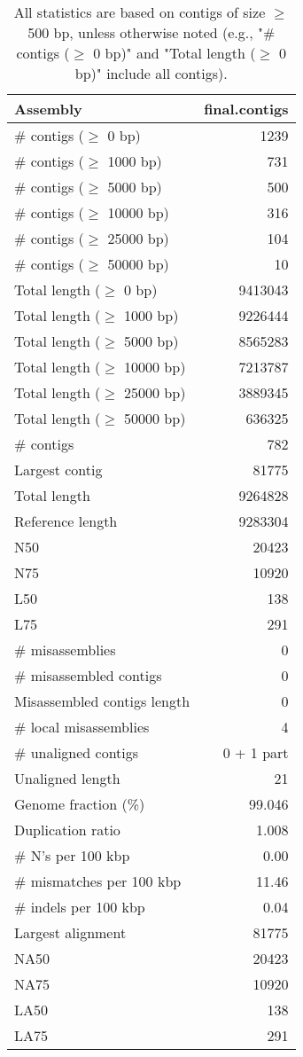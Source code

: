 \documentclass[12pt,a4paper]{article}
\begin{document}
\begin{table}[ht]
\begin{center}
\caption{All statistics are based on contigs of size $\geq$ 500 bp, unless otherwise noted (e.g., "\# contigs ($\geq$ 0 bp)" and "Total length ($\geq$ 0 bp)" include all contigs).}
\begin{tabular}{|l*{1}{|r}|}
\hline
Assembly & final.contigs \\ \hline
\# contigs ($\geq$ 0 bp) & 1239 \\ \hline
\# contigs ($\geq$ 1000 bp) & 731 \\ \hline
\# contigs ($\geq$ 5000 bp) & 500 \\ \hline
\# contigs ($\geq$ 10000 bp) & 316 \\ \hline
\# contigs ($\geq$ 25000 bp) & 104 \\ \hline
\# contigs ($\geq$ 50000 bp) & 10 \\ \hline
Total length ($\geq$ 0 bp) & 9413043 \\ \hline
Total length ($\geq$ 1000 bp) & 9226444 \\ \hline
Total length ($\geq$ 5000 bp) & 8565283 \\ \hline
Total length ($\geq$ 10000 bp) & 7213787 \\ \hline
Total length ($\geq$ 25000 bp) & 3889345 \\ \hline
Total length ($\geq$ 50000 bp) & 636325 \\ \hline
\# contigs & 782 \\ \hline
Largest contig & 81775 \\ \hline
Total length & 9264828 \\ \hline
Reference length & 9283304 \\ \hline
N50 & 20423 \\ \hline
N75 & 10920 \\ \hline
L50 & 138 \\ \hline
L75 & 291 \\ \hline
\# misassemblies & 0 \\ \hline
\# misassembled contigs & 0 \\ \hline
Misassembled contigs length & 0 \\ \hline
\# local misassemblies & 4 \\ \hline
\# unaligned contigs & 0 + 1 part \\ \hline
Unaligned length & 21 \\ \hline
Genome fraction (\%) & 99.046 \\ \hline
Duplication ratio & 1.008 \\ \hline
\# N's per 100 kbp & 0.00 \\ \hline
\# mismatches per 100 kbp & 11.46 \\ \hline
\# indels per 100 kbp & 0.04 \\ \hline
Largest alignment & 81775 \\ \hline
NA50 & 20423 \\ \hline
NA75 & 10920 \\ \hline
LA50 & 138 \\ \hline
LA75 & 291 \\ \hline
\end{tabular}
\end{center}
\end{table}
\end{document}
